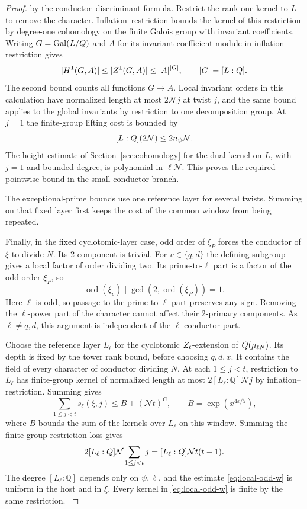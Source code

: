 \begin{proof}
by the conductor--discriminant formula. Restrict the
rank-one kernel to \(L\) to remove the character.
Inflation--restriction bounds the kernel of this restriction
by degree-one cohomology on the finite Galois group
with invariant coefficients. Writing \(G=\operatorname{Gal}(L/Q)\) and \(A\) for its invariant coefficient module in inflation--restriction gives
\[
 |H^1(G,A)|\le |Z^1(G,A)|\le |A|^{|G|},\qquad |G|=[L:Q] .
\]
The second bound counts all functions \(G\to A\). Local invariant
orders in this calculation have normalized length at most
\(2\mathcal N j\) at twist \(j\), and the same bound
applies to the global invariants by restriction to one
decomposition group. At \(j=1\) the finite-group lifting cost is bounded by
\[
            [L:Q](2\mathcal N)\le2n_\psi\mathcal N.
\] The height estimate
of Section~\ref{sec:cohomology} for the dual kernel on \(L\),
with \(j=1\) and bounded degree, is polynomial in
\(\ell\mathcal N\). This proves the required pointwise
bound in the small-conductor branch.
\label{cor:ordinary-odd-primes-9}


The exceptional-prime bounds use one reference layer for several twists. Summing on that fixed layer first keeps the cost of the common window from being repeated.


Finally, in the fixed cyclotomic-layer case, odd order of \(\xi_P\) forces the
conductor of \(\xi\) to divide \(N\). Its 2-component is
trivial. For \(v\in\{q,d\}\) the defining subgroup gives a local factor of order dividing two. Its prime-to-\(\ell\) part is a factor of the odd-order \(\xi_P\), so
\[
 \operatorname{ord}(\xi_v)\mid\gcd(2,\operatorname{ord}(\xi_P))=1 .
\]
Here \(\ell\) is odd, so passage to the prime-to-\(\ell\) part preserves any sign.
Removing the \(\ell\)-power part of the character
cannot affect their 2-primary components.
As \(\ell\ne q,d\), this argument is independent of the
\(\ell\)-conductor part.

Choose the reference layer \(L_\ell\)
for the cyclotomic \(Z_\ell\)-extension of
\(Q(\mu_{\ell N})\). Its depth is fixed by the tower rank
bound, before choosing \(q,d,x\). It contains the field of
every character of conductor dividing \(N\). At each \(1\le j<t\), restriction to \(L_\ell\) has
finite-group kernel of normalized length at most
\(2[L_\ell:\mathbb Q]\mathcal N j\) by inflation--restriction.
Summing gives
\[
         \sum_{1\le j<t}s_\ell(\xi,j)\le B+(\mathcal Nt)^C ,
         \qquad B=\exp(x^{4\varepsilon/5}),
 \tag{W}\label{eq:local-odd-w}
\]
where \(B\) bounds the sum of the kernels over \(L_\ell\)
on this window. Summing the finite-group restriction loss gives
\[
        2[L_\ell:Q]\mathcal N \sum_{1\le j<t}j
             =[L_\ell:Q]\mathcal N t(t-1).
\] The degree \([L_\ell:\mathbb Q]\) depends only on \(\psi,\ell\), and the estimate \eqref{eq:local-odd-w}
is uniform in the host and in \(\xi\). Every kernel in
\eqref{eq:local-odd-w} is finite by the same restriction.
\label{cor:ordinary-odd-primes-10}

\end{proof}

